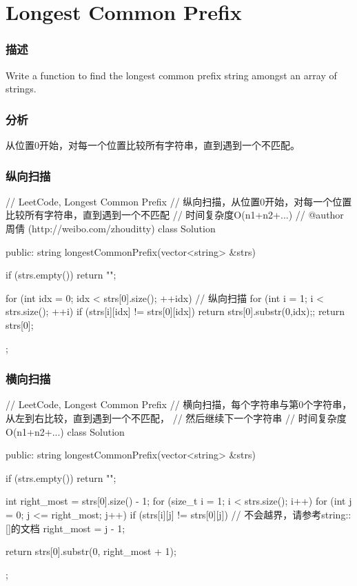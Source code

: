 \section{Longest Common Prefix} %
\label{sec:longest-common-prefix}


\subsubsection{描述}
Write a function to find the longest common prefix string amongst an array of strings.


\subsubsection{分析}
从位置0开始，对每一个位置比较所有字符串，直到遇到一个不匹配。


\subsubsection{纵向扫描}
\begin{Code}
// LeetCode, Longest Common Prefix
// 纵向扫描，从位置0开始，对每一个位置比较所有字符串，直到遇到一个不匹配
// 时间复杂度O(n1+n2+...)
// @author 周倩 (http://weibo.com/zhouditty)
class Solution {
public:
    string longestCommonPrefix(vector<string> &strs) {
        if (strs.empty()) return "";

        for (int idx = 0; idx < strs[0].size(); ++idx) { // 纵向扫描
            for (int i = 1; i < strs.size(); ++i) {
                if (strs[i][idx] != strs[0][idx]) return strs[0].substr(0,idx);;
            }
        }
        return strs[0];
    }
};
\end{Code}


\subsubsection{横向扫描}
\begin{Code}
// LeetCode, Longest Common Prefix
// 横向扫描，每个字符串与第0个字符串，从左到右比较，直到遇到一个不匹配，
// 然后继续下一个字符串
// 时间复杂度O(n1+n2+...)
class Solution {
public:
    string longestCommonPrefix(vector<string> &strs) {
        if (strs.empty()) return "";

        int right_most = strs[0].size() - 1;
        for (size_t i = 1; i < strs.size(); i++)
            for (int j = 0; j <= right_most; j++)
                if (strs[i][j] != strs[0][j])  // 不会越界，请参考string::[]的文档
                    right_most = j - 1;

        return strs[0].substr(0, right_most + 1);
    }
};
\end{Code}


